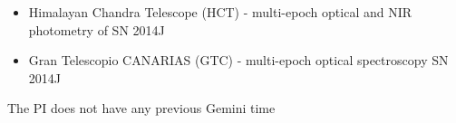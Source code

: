\documentclass[11pt]{article}
\begin{document}
\otherfacilities    %

\begin{itemize}
\item Himalayan Chandra Telescope (HCT) - multi-epoch optical and NIR photometry of SN 2014J
\item Gran Telescopio CANARIAS (GTC) - multi-epoch optical spectroscopy SN 2014J
\end{itemize}

\bigskip


\thepast    %

The PI does not have any previous Gemini time

\bigskip



%

%
% 
%

\itcresults






\end{document}
